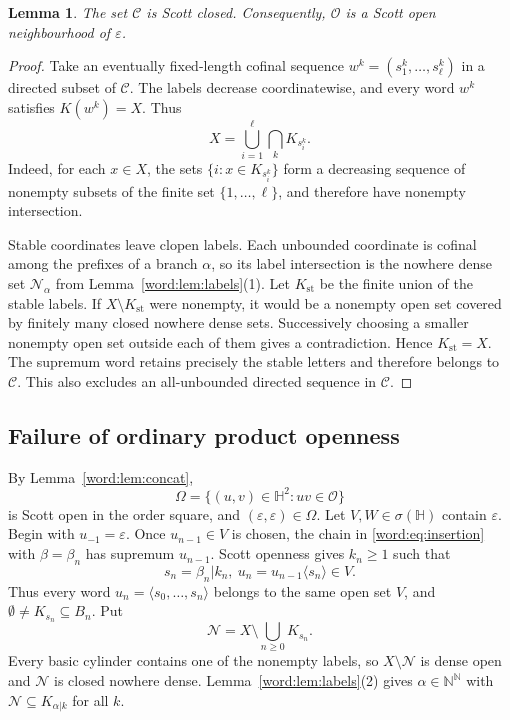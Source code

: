 \documentclass[fleqn,preprint,3p,a4paper]{elsarticle}
\newtheorem{lemma}[theorem]{Lemma}
\theoremstyle{definition}
\newcommand{\N}{\mathbb N}
\newcommand{\HH}{\mathbb H}
\begin{document}
\begin{lemma}\label{word:lem:closed}
The set $\mathcal C$ is Scott closed. Consequently, $\mathcal O$ is a Scott open neighbourhood of $\varepsilon$.
\end{lemma}
\begin{proof}
Take an eventually fixed-length cofinal sequence
$w^k=(s_1^k,\ldots,s_\ell^k)$ in a directed subset of $\mathcal C$. The labels decrease coordinatewise, and every word $w^k$ satisfies $K(w^k)=X$. Thus
\begin{equation}\label{word:eq:finiteinter}
 X=\bigcup_{i=1}^{\ell}\bigcap_kK_{s_i^k}.
\end{equation}
Indeed, for each $x\in X$, the sets $\{i:x\in K_{s_i^k}\}$ form a decreasing sequence of nonempty subsets of the finite set $\{1,\ldots,\ell\}$, and therefore have nonempty intersection.

Stable coordinates leave clopen labels. Each unbounded coordinate is cofinal among the prefixes of a branch $\alpha$, so its label intersection is the nowhere dense set $\mathcal N_\alpha$ from Lemma~\ref{word:lem:labels}(1). Let $K_{\mathrm{st}}$ be the finite union of the stable labels. If $X\setminus K_{\mathrm{st}}$ were nonempty, it would be a nonempty open set covered by finitely many closed nowhere dense sets. Successively choosing a smaller nonempty open set outside each of them gives a contradiction. Hence $K_{\mathrm{st}}=X$. The supremum word retains precisely the stable letters and therefore belongs to $\mathcal C$. This also excludes an all-unbounded directed sequence in $\mathcal C$.
\end{proof}

\subsection{Failure of ordinary product openness}
By Lemma~\ref{word:lem:concat},
\[
 \Omega=\{(u,v)\in\HH^2:uv\in\mathcal O\}
\]
is Scott open in the order square, and $(\varepsilon,\varepsilon)\in\Omega$. Let $V,W\in\sigma(\HH)$ contain $\varepsilon$. Begin with $u_{-1}=\varepsilon$. Once $u_{n-1}\in V$ is chosen, the chain in \eqref{word:eq:insertion} with $\beta=\beta_n$ has supremum $u_{n-1}$. Scott openness gives $k_n\geq1$ such that
\begin{equation}\label{word:eq:left}
 s_n=\beta_n|k_n,
 ~
 u_n=u_{n-1}\langle s_n\rangle\in V.
\end{equation}
Thus every word $u_n=\langle s_0,\ldots,s_n\rangle$ belongs to the same open set $V$, and
$\emptyset\neq K_{s_n}\subseteq B_n$. Put
\[
 \mathcal N=X\setminus\bigcup_{n\geq0}K_{s_n}.
\]
Every basic cylinder contains one of the nonempty labels, so $X\setminus\mathcal N$ is dense open and $\mathcal N$ is closed nowhere dense. Lemma~\ref{word:lem:labels}(2) gives $\alpha\in\N^\N$ with
$\mathcal N\subseteq K_{\alpha|k}$ for all $k$.
\end{document}
